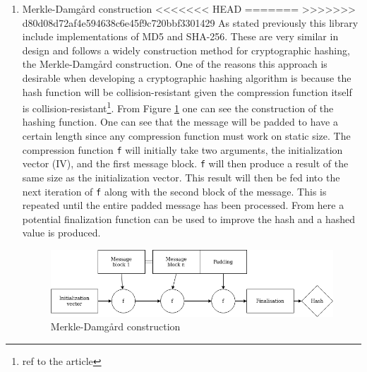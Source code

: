 \documentclass[a4paper]{article}
\begin{document}
\begin{enumerate}
\item Merkle-Damgård construction
<<<<<<< HEAD
\label{sec:org9f67b36}
=======
\label{sec:org8769d2a}
>>>>>>> d80d08d72af4e594638c6e45f9c720bbf3301429
As stated previously this library include implementations of MD5 and SHA-256. These are very similar in design and follows a widely construction method for cryptographic hashing, the Merkle-Damgård construction. One of the reasons this approach is desirable when developing a cryptographic hashing algorithm is because the hash function will be collision-resistant given the compression function itself is collision-resistant\footnote{ref to the article}.
From Figure \ref{fig:Merkle} one can see the construction of the hashing function. One can see that the message will be padded to have a certain length since any compression function must work on static size. The compression function \texttt{f} will initially take two arguments, the initialization vector (IV), and the first message block. \texttt{f} will then produce a result of the same size as the initialization vector. This result will then be fed into the next iteration of \texttt{f} along with the second block of the message. This is repeated until the entire padded message has been processed. From here a potential finalization function can be used to improve the hash and a hashed value is produced.

\begin{figure}[htbp]
\centering
\includegraphics[width=.9\linewidth]{Background/merkle.png}
\caption{\label{fig:Merkle}Merkle-Damgård construction}
\end{figure}
\end{enumerate}
\end{document}
